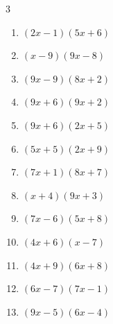 


\setcounter{quesnum}{45}

\begin{multicols}{3}
\begin{enumerate}
  \itemsep=10pt
  \item $(2x-1)(5x+6)$


  \item $(x-9)(9x-8)$


  \item $(9x-9)(8x+2)$


  \item $(9x+6)(9x+2)$


  \item $(9x+6)(2x+5)$


  \item $(5x+5)(2x+9)$


  \item $(7x+1)(8x+7)$


  \item $(x+4)(9x+3)$


  \item $(7x-6)(5x+8)$


  \item $(4x+6)(x-7)$


  \item $(4x+9)(6x+8)$


  \item $(6x-7)(7x-1)$


  \item $(9x-5)(6x-4)$



\end{enumerate}
\end{multicols}
